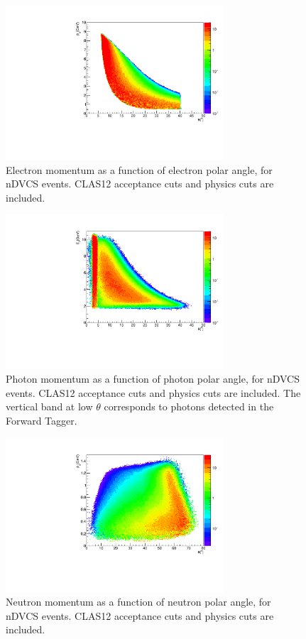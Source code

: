 \begin{figure}[bht]
\begin{center}
\includegraphics[width=3.2in]{theta_p_el.pdf}
\caption [Electron momentum as a function of electron polar angle]
{Electron momentum as a function of electron polar angle, for nDVCS events. CLAS12 acceptance cuts and physics cuts are included.}
\label{e_th_p}
\end{center}
\end{figure}

\begin{figure}  
\begin{center}
\includegraphics[width=3.2in]{theta_p_phot_FT.pdf}
\caption [Photon momentum as a function of photon polar angle, for nDVCS events]
{Photon momentum as a function of photon polar angle, for nDVCS events. CLAS12 acceptance cuts and physics cuts are included. The vertical band at low $\theta$ corresponds to photons detected in the Forward Tagger.} 
\label{g_th_p}
\end{center}
\end{figure}

\begin{figure}  
\begin{center}
\includegraphics[width=3.2in]{theta_p_neut.pdf}
\caption [Neutron momentum as a function of neutron polar angle]
{Neutron momentum as a function of neutron polar angle, for nDVCS events. CLAS12 acceptance cuts and physics cuts are included.}
\label{n_th_p}
\end{center}
\end{figure}


